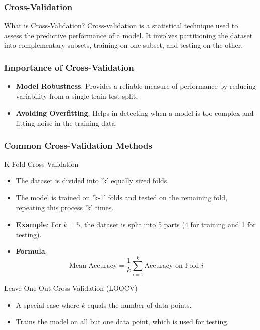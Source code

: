 \documentclass[aspectratio=169]{beamer}
\begin{document}
\begin{frame}
    \frametitle{Cross-Validation}
    \begin{block}{What is Cross-Validation?}
        Cross-validation is a statistical technique used to assess the predictive performance of a model. It involves partitioning the dataset into complementary subsets, training on one subset, and testing on the other.
    \end{block}
\end{frame}

\begin{frame}
    \frametitle{Importance of Cross-Validation}
    \begin{itemize}
        \item \textbf{Model Robustness}: Provides a reliable measure of performance by reducing variability from a single train-test split.
        \item \textbf{Avoiding Overfitting}: Helps in detecting when a model is too complex and fitting noise in the training data.
    \end{itemize}
\end{frame}

\begin{frame}
    \frametitle{Common Cross-Validation Methods}
    \begin{block}{K-Fold Cross-Validation}
        \begin{itemize}
            \item The dataset is divided into 'k' equally sized folds.
            \item The model is trained on 'k-1' folds and tested on the remaining fold, repeating this process 'k' times.
            \item \textbf{Example}: For \(k=5\), the dataset is split into 5 parts (4 for training and 1 for testing).
            \item \textbf{Formula}:
            \begin{equation}
                \text{Mean Accuracy} = \frac{1}{k} \sum_{i=1}^{k} \text{Accuracy on Fold } i
            \end{equation}
        \end{itemize}
    \end{block}

    \begin{block}{Leave-One-Out Cross-Validation (LOOCV)}
        \begin{itemize}
            \item A special case where \(k\) equals the number of data points.
            \item Trains the model on all but one data point, which is used for testing.
        \end{itemize}
    \end{block}
\end{frame}
\end{document}
